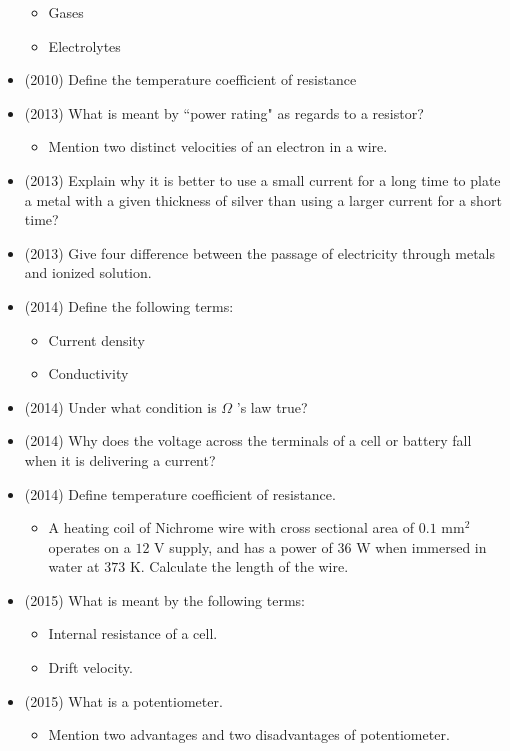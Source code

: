 \documentclass{article}
\begin{document}
\begin{itemize}
 \begin{itemize}
\item Gases
\item Electrolytes
\end{itemize}
\item (2010)  Define the temperature coefficient of resistance
\item (2013)  What is meant by “power rating" as regards to a resistor?
 \begin{itemize}
\item Mention two distinct velocities of an electron in a wire.
\end{itemize}
\item (2013)  Explain why it is better to use a small current for a long time to plate a metal with a given thickness of silver than using a larger current for a short time? 
\item (2013)  Give four difference between the passage of electricity through metals and  ionized solution.
\item (2014)  Define the following terms:
 \begin{itemize}
\item Current density
\item Conductivity 
\end{itemize}
\item (2014)  Under what condition is $ \Omega $ ’s law true?
\item (2014)  Why does the voltage across the terminals of a cell or battery fall when it is delivering a current? 
\item (2014)  Define temperature coefficient of resistance.
 \begin{itemize}
\item A heating coil of Nichrome wire with cross sectional area of $ 0.1 $ mm$ ^{2}$ operates on a $ 12$ V supply, and has a power of $ 36$ W when immersed in water at $ 373$ K. Calculate the length of the wire.
\end{itemize}
\item (2015)  What is meant by the following terms:
 \begin{itemize}
\item  Internal resistance of a cell. 
\item  Drift velocity. 
\end{itemize}
\item (2015)  What is a potentiometer. 
 \begin{itemize}
\item Mention two advantages and two disadvantages of potentiometer.

\end{itemize}
\end{itemize}
\end{document}
